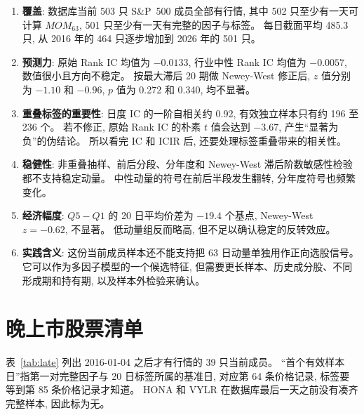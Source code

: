 \documentclass[11pt,a4paper]{article}
\newcommand{\SP}{S\&P~500}
\newcommand{\MOM}{\mathit{MOM}}
\begin{document}
\begin{enumerate}
\item \textbf{覆盖}:
数据库当前 503 只 \SP{} 成员全部有行情, 其中 502 只至少有一天可计算 $\MOM_{63}$, 501 只至少有一天有完整的因子与标签。
每日截面平均 485.3 只, 从 2016 年的 464 只逐步增加到 2026 年的 501 只。

\item \textbf{预测力}:
原始 Rank IC 均值为 $-0.0133$, 行业中性 Rank IC 均值为 $-0.0057$, 数值很小且方向不稳定。
按最大滞后 20 期做 Newey-West 修正后, $z$ 值分别为 $-1.10$ 和 $-0.96$, $p$ 值为 0.272 和 0.340, 均不显著。

\item \textbf{重叠标签的重要性}:
日度 IC 的一阶自相关约 0.92, 有效独立样本只有约 196 至 236 个。
若不修正, 原始 Rank IC 的朴素 $t$ 值会达到 $-3.67$, 产生“显著为负”的伪结论。
所以看完 IC 和 ICIR 后, 还要处理标签重叠带来的相关性。

\item \textbf{稳健性}:
非重叠抽样、前后分段、分年度和 Newey-West 滞后阶数敏感性检验都不支持稳定动量。
中性动量的符号在前后半段发生翻转, 分年度符号也频繁变化。

\item \textbf{经济幅度}:
$Q5-Q1$ 的 20 日平均价差为 $-19.4$ 个基点, Newey-West $z=-0.62$, 不显著。
低动量组反而略高, 但不足以确认稳定的反转效应。

\item \textbf{实践含义}:
这份当前成员样本还不能支持把 63 日动量单独用作正向选股信号。
它可以作为多因子模型的一个候选特征, 但需要更长样本、历史成分股、不同形成期和持有期, 以及样本外检验来确认。
\end{enumerate}

\appendix

\section{晚上市股票清单}
\label{app:late}

表~\ref{tab:late} 列出 2016-01-04 之后才有行情的 39 只当前成员。
“首个有效样本日”指第一对完整因子与 20 日标签所属的基准日, 对应第 64 条价格记录, 标签要等到第 85 条价格记录才知道。
HONA 和 VYLR 在数据库最后一天之前没有凑齐完整样本, 因此标为无。
\end{document}
